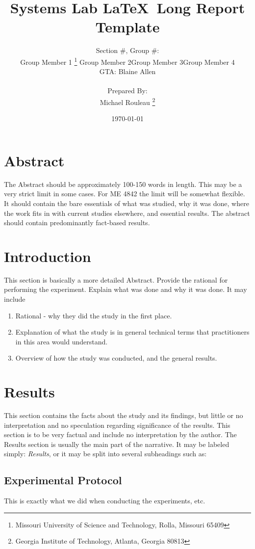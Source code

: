 \documentclass[11pt,letter]{report}
\title{\Huge{Systems Lab \LaTeX\  Long Report Template}}
\author{Section \#, Group \#: \\
	Group Member 1 \footnote{Missouri University of Science and Technology, Rolla, Missouri 65409} 
	\quad Group Member 2\footnotemark[1]
	\quad Group Member 3\footnotemark[1]
	\quad Group Member 4\footnotemark[1] 
	\\ GTA: Blaine Allen \\ \\ 
	Prepared By: \\ Michael Rouleau \footnote{Georgia Institute of Technology, Atlanta, Georgia 80813}
}
\date{\today}
\begin{document}
\maketitle

\section*{Abstract}
The Abstract should be approximately 100-150 words in length. This may be a very strict limit in some cases. For ME 4842 the limit will be somewhat flexible. It should contain the bare essentials of what was studied, why it was done, where the work fits in with current studies elsewhere, and essential results. The abstract should contain predominantly fact-based results.

\section*{Introduction}
This section is basically a more detailed Abstract. Provide the rational for performing the experiment. Explain what was done and why it was done. It may include
	\begin{enumerate}
		\item Rational - why they did the study in the first place.
		\item Explanation of what the study is in general technical terms that practitioners in this area would understand.
		\item Overview of how the study was conducted, and the general results.
	\end{enumerate}

\section*{Results}
This section contains the facts about the study and its findings, but little or no interpretation and no speculation regarding significance of the results. This section is to be very factual and include no interpretation by the author. The Results section is usually the main part of the narrative. It may be labeled simply: \emph{Results}, or it may be split into several subheadings such as:

	\subsection*{Experimental Protocol}
		This is exactly what we did when conducting the experiments, etc.
\end{document}
